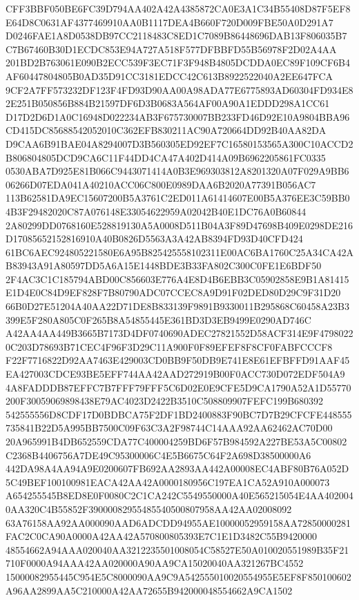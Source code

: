 \documentclass[UTF8,fontset=fandol,zihao=-4,a4paper]{ctexart}
\begin{document}
{{CFF3BBF050BE6FC39D794AA402A42A4385872CA0E3A1C34B55408D87F5EF8E64D8C0631AF4377469910AA0B1117DEA4B660F720D009FBE50A0D291A7
D0246FAE1A8D0538DB97CC2118483C8ED1C7089B86448696DAB13F806035B7C7B67460B30D1ECDC853E94A727A518F577DFBBFD55B56978F2D02A4AA
201BD2B763061E090B2ECC539F3EC71F3F948B4805DCDDA0EC89F109CF6B4AF60447804805B0AD35D91CC3181EDCC42C613B8922522040A2EE647FCA
9CF2A7FF573232DF123F4FD93D90AA00A98ADA77E6775893AD60304FD934E82E251B050856B884B21597DF6D3B0683A564AF00A90A1EDDD298A1CC61
D17D2D6D1A0C16948D022234AB3F675730007BB233FD46D92E10A9804BBA96CD415DC85688542052010C362EFB830211AC90A720664DD92B40AA82DA
D9CAA6B91BAE04A8294007D3B560305ED92EF7C16580153565A300C10ACCD2B806804805DCD9CA6C11F44DD4CA47A402D414A09B6962205861FC0335
0530ABA7D925E81B066C9443071414A0B3E969303812A8201320A07F029A9BB606266D07EDA041A40210ACC06C800E0989DAA6B2020A77391B056AC7
113B62581DA9EC15607200B5A3761C2ED011A61414607E00B5A376EE3C59BB04B3F29482020C87A076148E33054622959A02042B40E1DC76A0B60844
2A80299DD0768160E528819130A5A0008D511B04A3F89D47698B409E0298DE216D17085652152816910A40B0826D5563A3A42AB8394FD93D40CFD424
61BC6AEC924805221580E6A95B825425558102311E00AC6BA1760C25A34CA42AB83943A91A80597DD5A6A15E1448BDE3B33FA802C300C0FE1E6BDF50
2F4AC3C1C185794ABD00C856603E776A4E8D4B6EBB3C05902858E9B1A81415E1D4E0C84D9EF828F7B80790ADC07CCEC8A9D91F02DED80D29C9F31D20
66B0D27E51204A40AA22D71DE8B833139F9891B9330011B295868C60458A23B3399E5F280A805C0F265B8A54855445E361BD3D3EB9499E0290AD746C
A42AA4AA449B3665B7173D4DF0740690ADEC27821552D58ACF314E9F47980220C203D78693B71CEC4F96F3D29C11A900F0F89EFEF8F8CF0FABFCCCF8
F22F7716822D92AA7463E429003CD0BB9F50DB9E741E8E61EFBFFD91AAF45EA427003CDCE93BE5EFF744AA42AAD272919B00F0ACC730D072EDF504A9
4A8FADDDB87EFFC7B7FFF79FFF5C6D02E0E9CFE5D9CA1790A52A1D55770200F30059069898438E79AC4023D2422B3510C508809907FEFC199B680392
542555556D8CDF17D0BDBCA75F2DF1BD2400883F90BC7D7B29CFCFE448555735841B22D5A995BB7500C09F63C3A2F98744C14AAA92AA62462AC70D00
20A965991B4DB652559CDA77C400004259BD6F57B984592A227BE53A5C00802C2368B4406756A7DE49C95300006C4E5B6675C64F2A698D38500000A6
442DA98A4AA94A9E0200607FB692AA2893AA442A00008EC4ABF80B76A052D5C49BEF100100981EACA42AA42A0000180956C197EA1CA52A910A000073
A654255545B8ED8E0F0080C2C1CA242C5549550000A40E565215054E4AA4020040AA320C4B55852F39000082955485540500807958AA42AA02008092
63A76158AA92AA000090AAD6ADCDD94955AE10000052959158AA72850000281FAC2C0CA90A0000A42AA42A570800805393E7C1E1D3482C55B9420000
48554662A94AAA020040AA3212235501008054C58527E50A010020551989B35F21710F0000A94AAA42AA020000A90AA9CA15020040AA321267BC4552
15000082955445C954E5C8000090AA9C9A542555010020554955E5EF8F850100602A96AA2899AA5C210000A42AA72655B942000048554662A9CA1502
}}
\end{document}
